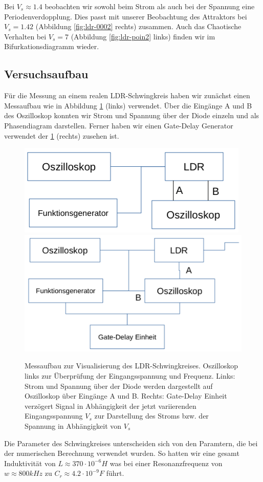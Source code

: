 \documentclass{scrartcl}
\begin{document}
Bei $V_s\approx1.4$ beobachten wir sowohl beim Strom als auch bei der Spannung eine Periodenverdopplung. Dies passt mit unserer Beobachtung des Attraktors bei $V_s=1.42$ (Abbildung \ref{fig:ldr-0002} rechts) zusammen. Auch das Chaotische Verhalten bei $V_s=7$ (Abbildung \ref{fig:ldr-poin2} links) finden wir im Bifurkationsdiagramm wieder.

\subsection{ Versuchsaufbau}
Für die Messung an einem realen LDR-Schwingkreis haben wir zunächst einen Messaufbau wie in Abbildung \ref{fig:ldr-aufbau1} (links) verwendet. Über die Eingänge A und B des Oszilloskop konnten wir Strom und Spannung über der Diode einzeln und als Phasendiagram darstellen. Ferner haben wir einen Gate-Delay Generator verwendet der \ref{fig:ldr-aufbau1} (rechts) zusehen ist.
\begin{figure}[!htbp]
\includegraphics[scale=0.4]{aufbau1}
\includegraphics[scale=0.38]{aufbau2}
\caption{Messaufbau zur Visualisierung des LDR-Schwingkreises. Oszilloskop links zur Überprüfung der Eingangsspannung und Frequenz. Links: Strom und Spannung über der Diode werden dargestellt auf Oszilloskop über Eingänge A und B. Rechts: Gate-Delay Einheit verzögert Signal in Abhängigkeit der jetzt variierenden Eingangsspannung $V_s$ zur Darstellung des Stroms bzw. der Spannung in Abhängigkeit von $V_s$ }
\label{fig:ldr-aufbau1}
\end{figure}
Die Parameter des Schwingkreises unterscheiden sich von den Paramtern, die bei der numerischen Berechnung verwendet wurden. So hatten wir eine gesamt Induktivität von $L\approx370\cdot10^{-6}H$ was bei einer Resonanzfrequenz von $w\approx800kHz$ zu $C_r\approx4.2\cdot10^{-9}F$ führt.
\end{document}
